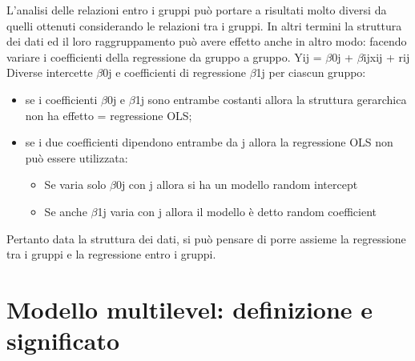 \documentclass[a4page, 11pt]{article} %
\begin{document}
\newline
L’analisi delle relazioni entro i gruppi può portare a risultati molto diversi da quelli ottenuti considerando le relazioni tra i gruppi.
In altri termini la struttura dei dati ed il loro raggruppamento può avere effetto anche in altro modo: facendo variare i coefficienti della regressione da gruppo a gruppo.
\newline
Yij = $\beta$0j + $\beta$ijxij + rij
\newline
Diverse intercette $\beta$0j e coefficienti di regressione $\beta$1j per ciascun gruppo:
\begin{itemize}	
\item se i coefficienti $\beta$0j e $\beta$1j sono entrambe costanti allora la struttura
gerarchica non ha effetto = regressione OLS;
\item se i due coefficienti dipendono entrambe da j allora la regressione OLS
non può essere utilizzata:
	\begin{itemize}
	\item Se varia solo $\beta$0j con j allora si ha un modello random intercept
 	\item Se anche $\beta$1j varia con j allora il modello è detto random coefficient
	\end{itemize}
\end{itemize}
Pertanto data la struttura dei dati, si può pensare di porre assieme la regressione tra i gruppi e la regressione entro i gruppi.


\section{Modello multilevel: definizione e significato}
\end{document}
